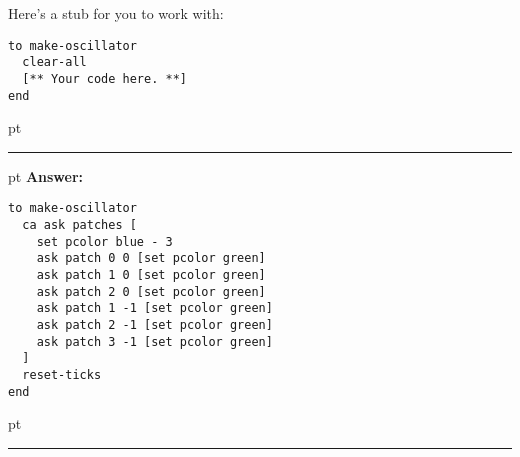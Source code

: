 \documentclass[11pt]{book}
\begin{document}
\begin{enumerate}
Here's a stub for you to work with:
\begin{verbatim}
to make-oscillator
  clear-all
  [** Your code here. **]
end
\end{verbatim}

\ifnum{}
 pt
\hrule
{} pt
{\bf Answer: }
\begin{verbatim}
to make-oscillator
  ca ask patches [
    set pcolor blue - 3
    ask patch 0 0 [set pcolor green]
    ask patch 1 0 [set pcolor green]
    ask patch 2 0 [set pcolor green]
    ask patch 1 -1 [set pcolor green]
    ask patch 2 -1 [set pcolor green]
    ask patch 3 -1 [set pcolor green]
  ]
  reset-ticks
end
\end{verbatim}
 pt
\hrule
\fi

\end{enumerate}
\end{document}
